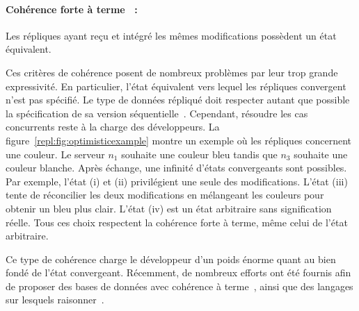 \paragraph{Cohérence forte à terme~\cite{shapiro2011conflict} :} Les répliques
ayant reçu et intégré les mêmes modifications possèdent un état équivalent.


\begin{figure*}
  \centering
  \hspace{10pt}
  \caption[Convergence en réplication optimiste]
  {\label{repl:fig:optimisticexample} Exemple de réplication optimiste avec
    modifications concurrentes.}
\end{figure*}


Ces critères de cohérence posent de nombreux problèmes par leur trop grande
expressivité. En particulier, l'état équivalent vers lequel les répliques
convergent n'est pas spécifié. Le type de données répliqué doit respecter autant
que possible la spécification de sa version
séquentielle~\cite{bieniusa2012brief}. Cependant, résoudre les cas concurrents
reste à la charge des développeurs. La figure~\ref{repl:fig:optimisticexample}
montre un exemple où les répliques concernent une couleur. Le serveur $n_1$
souhaite une couleur bleu tandis que $n_3$ souhaite une couleur blanche. Après
échange, une infinité d'états convergeants sont possibles. Par exemple, l'état
(i) et (ii) privilégient une seule des modifications. L'état (iii) tente de
réconcilier les deux modifications en mélangeant les couleurs pour obtenir un
bleu plus clair. L'état (iv) est un état arbitraire sans signification
réelle. Tous ces choix respectent la cohérence forte à terme, même celui de
l'état arbitraire.

Ce type de cohérence charge le développeur d'un poids énorme quant au bien fondé
de l'état convergeant.  Récemment, de nombreux efforts ont été fournis afin de
proposer des bases de données avec cohérence à terme~\cite{dynamo, riak,
  cassandra, mongodb}, ainsi que des langages sur lesquels
raisonner~\cite{conway2012logic, meiklejohn2015lasp}.



